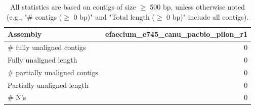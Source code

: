 \documentclass[12pt,a4paper]{article}
\begin{document}
\begin{table}[ht]
\begin{center}
\caption{All statistics are based on contigs of size $\geq$ 500 bp, unless otherwise noted (e.g., "\# contigs ($\geq$ 0 bp)" and "Total length ($\geq$ 0 bp)" include all contigs).}
\begin{tabular}{|l*{1}{|r}|}
\hline
Assembly & efaecium\_e745\_canu\_pacbio\_pilon\_r1 \\ \hline
\# fully unaligned contigs & 0 \\ \hline
Fully unaligned length & 0 \\ \hline
\# partially unaligned contigs & 0 \\ \hline
Partially unaligned length & 0 \\ \hline
\# N's & 0 \\ \hline
\end{tabular}
\end{center}
\end{table}
\end{document}
